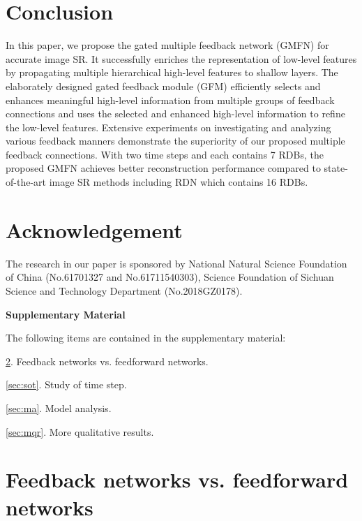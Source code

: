 \documentclass{bmvc2k}
\begin{document}
	\section{Conclusion}	
	In this paper, we propose the gated multiple feedback network (GMFN) for accurate image SR. It successfully enriches the representation of low-level features by propagating multiple hierarchical high-level features to shallow layers. The elaborately designed gated feedback module (GFM) efficiently selects and enhances meaningful high-level information from multiple groups of feedback connections and uses the selected and enhanced high-level information to refine the low-level features. Extensive experiments on investigating and analyzing various feedback manners demonstrate the superiority of our proposed multiple feedback connections. With two time steps and each contains 7 RDBs, the proposed GMFN achieves better reconstruction performance compared to state-of-the-art image SR methods including RDN\cite{zhang2018residual} which contains 16 RDBs.
	
	\vspace{-4mm}
	\section*{Acknowledgement}
	\noindent The research in our paper is sponsored by National Natural Science Foundation of China (No.61701327 and No.61711540303), Science Foundation of Sichuan Science and Technology Department (No.2018GZ0178).
	
	
	
	\clearpage
	\appendix
	


\begin{center} 
	\noindent\textbf{\Large{Supplementary Material}}
\end{center}
\vspace{4mm}

The following items are contained in the supplementary material:

\ref{sec:ffvsfb}. Feedback networks vs. feedforward networks.

\ref{sec:sot}. Study of time step.

\ref{sec:ma}. Model analysis.

\ref{sec:mqr}. More qualitative results.




\section{Feedback networks vs. feedforward networks}
\label{sec:ffvsfb}
\end{document}

